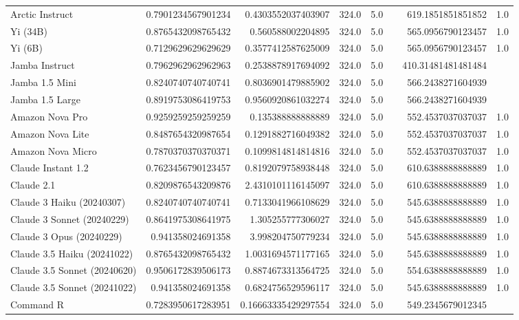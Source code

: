 \begin{table}[htp]
{\begin{tabular}{lrrrrrrr}
Arctic Instruct & 0.7901234567901234 & 0.4303552037403907 & 324.0 & 5.0 &  & 619.1851851851852 & 1.0 \\
Yi (34B) & 0.8765432098765432 & 0.560588002204895 & 324.0 & 5.0 &  & 565.0956790123457 & 1.0 \\
Yi (6B) & 0.7129629629629629 & 0.3577412587625009 & 324.0 & 5.0 &  & 565.0956790123457 & 1.0 \\
Jamba Instruct & 0.7962962962962963 & 0.2538878917694092 & 324.0 & 5.0 &  & 410.31481481481484 &  \\
Jamba 1.5 Mini & 0.8240740740740741 & 0.8036901479885902 & 324.0 & 5.0 &  & 566.2438271604939 &  \\
Jamba 1.5 Large & 0.8919753086419753 & 0.9560920861032274 & 324.0 & 5.0 &  & 566.2438271604939 &  \\
Amazon Nova Pro & 0.9259259259259259 & 0.135388888888889 & 324.0 & 5.0 &  & 552.4537037037037 & 1.0 \\
Amazon Nova Lite & 0.8487654320987654 & 0.1291882716049382 & 324.0 & 5.0 &  & 552.4537037037037 & 1.0 \\
Amazon Nova Micro & 0.7870370370370371 & 0.1099814814814816 & 324.0 & 5.0 &  & 552.4537037037037 & 1.0 \\
Claude Instant 1.2 & 0.7623456790123457 & 0.8192079758938448 & 324.0 & 5.0 &  & 610.6388888888889 & 1.0 \\
Claude 2.1 & 0.8209876543209876 & 2.4310101116145097 & 324.0 & 5.0 &  & 610.6388888888889 & 1.0 \\
Claude 3 Haiku (20240307) & 0.8240740740740741 & 0.7133041966108629 & 324.0 & 5.0 &  & 545.6388888888889 & 1.0 \\
Claude 3 Sonnet (20240229) & 0.8641975308641975 & 1.305255777306027 & 324.0 & 5.0 &  & 545.6388888888889 & 1.0 \\
Claude 3 Opus (20240229) & 0.941358024691358 & 3.998204750779234 & 324.0 & 5.0 &  & 545.6388888888889 & 1.0 \\
Claude 3.5 Haiku (20241022) & 0.8765432098765432 & 1.0031694571177165 & 324.0 & 5.0 &  & 545.6388888888889 & 1.0 \\
Claude 3.5 Sonnet (20240620) & 0.9506172839506173 & 0.8874673313564725 & 324.0 & 5.0 &  & 554.6388888888889 & 1.0 \\
Claude 3.5 Sonnet (20241022) & 0.941358024691358 & 0.6824756529596117 & 324.0 & 5.0 &  & 545.6388888888889 & 1.0 \\
Command R & 0.7283950617283951 & 0.16663335429297554 & 324.0 & 5.0 &  & 549.2345679012345 &  \\

\end{tabular}}
\end{table}
